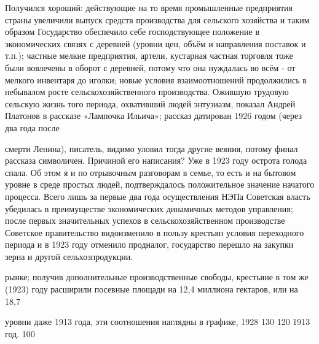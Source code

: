 Получился хороший: действующие на то время промышленные предприятия страны увеличили выпуск средств производства для сельского хозяйства и таким образом Государство обеспечило себе господствующее положение в экономических связях с деревней (уровни цен, объём и направления поставок и т.п.); частные мелкие предприятия, артели, кустарная частная торговля тоже были вовлечены в оборот с деревней, потому что она нуждалась во всём - от мелкого инвентаря до иголки; новые условия взаимоотношений продолжились в небывалом росте сельскохозяйственного производства. Ожившую трудовую сельскую жизнь того периода, охвативший людей энтузиазм, показал Андрей Платонов в рассказе «Лампочка Ильича»; рассказ датирован 1926 годом (через два года после

смерти Ленина), писатель, видимо уловил тогда другие веяния, потому финал рассказа символичен. Причиной его написания? Уже в 1923 году острота голода спала. Об этом я и по отрывочным разговорам в семье, то есть и на бытовом уровне в среде простых людей, подтверждалось положительное значение начатого процесса. Всего лишь за первые два года осуществления НЭПа Советская власть убедилась в преимуществе экономических динамичных методов управления; после первых значительных успехов в сельскохозяйственном производстве Советское правительство видоизменило в пользу крестьян условия переходного периода и в 1923 году отменило продналог, государство перешло на закупки зерна и другой сельхозпродукции.

рынке; получив дополнительные производственные свободы, крестьяне в том же (1923) году расширили посевные площади на 12,4 миллиона гектаров, или на 18,7%

уровни даже 1913 года, эти соотношения наглядны в графике, 1928 130 120 1913 год. 100%


